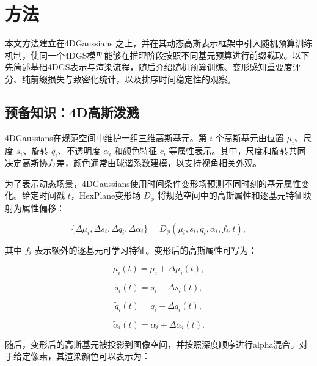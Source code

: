 \documentclass[sn-mathphys]{sn-jnl}
\begin{document}
\section{方法}
\label{sec:method}

本文方法建立在4DGaussians \cite{wu20244dgaussians} 之上，并在其动态高斯表示框架中引入随机预算训练机制，使同一个4DGS模型能够在推理阶段按照不同基元预算进行前缀截取。以下先简述基础4DGS表示与渲染流程，随后介绍随机预算训练、变形感知重要度评分、纯前缀损失与致密化统计，以及排序时间稳定性的观察。

\subsection{预备知识：4D高斯泼溅}
\label{sec:prelim}

4DGaussians在规范空间中维护一组三维高斯基元。第 $i$ 个高斯基元由位置 $\mu_i$、尺度 $s_i$、旋转 $q_i$、不透明度 $\alpha_i$ 和颜色特征 $c_i$ 等属性表示。其中，尺度和旋转共同决定高斯协方差，颜色通常由球谐系数建模，以支持视角相关外观。

为了表示动态场景，4DGaussians使用时间条件变形场预测不同时刻的基元属性变化。给定时间戳 $t$，HexPlane变形场 $D_{\phi}$ 将规范空间中的高斯属性和逐基元特征映射为属性偏移：

\begin{equation}
\{\Delta \mu_i, \Delta s_i, \Delta q_i, \Delta \alpha_i\}
=
D_{\phi}(\mu_i, s_i, q_i, \alpha_i, f_i, t),
\label{eq:deformation}
\end{equation}

其中 $f_i$ 表示额外的逐基元可学习特征。变形后的高斯属性可写为：

\begin{equation}
\tilde{\mu}_i(t)=\mu_i+\Delta \mu_i(t),
\end{equation}

\begin{equation}
\tilde{s}_i(t)=s_i+\Delta s_i(t),
\end{equation}

\begin{equation}
\tilde{q}_i(t)=q_i+\Delta q_i(t),
\end{equation}

\begin{equation}
\tilde{\alpha}_i(t)=\alpha_i+\Delta \alpha_i(t).
\end{equation}

随后，变形后的高斯基元被投影到图像空间，并按照深度顺序进行alpha混合。对于给定像素，其渲染颜色可以表示为：
\end{document}
